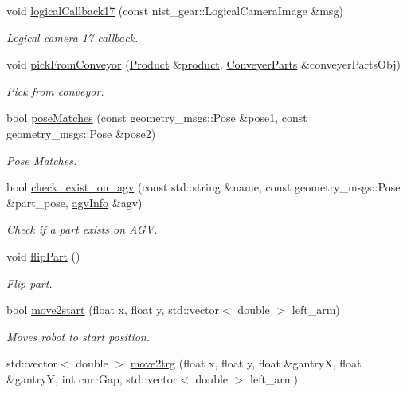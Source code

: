 \begin{DoxyCompactItemize}
void \hyperlink{classGantryControl_a9d745504ec1dbcc8549f5a604f34bbcc}{logical\+Callback17} (const nist\+\_\+gear\+::\+Logical\+Camera\+Image \&msg)
\begin{DoxyCompactList}\small\item\em Logical camera 17 callback. \end{DoxyCompactList}\item 
void \hyperlink{classGantryControl_a0220eeac3687f7f043fa4014f5ea302e}{pick\+From\+Conveyor} (\hyperlink{structProduct}{Product} \&\hyperlink{utils_8h_a48a7207852c0455cce7e65703b12ec7e}{product}, \hyperlink{classConveyerParts}{Conveyer\+Parts} \&conveyer\+Parts\+Obj)
\begin{DoxyCompactList}\small\item\em Pick from conveyor. \end{DoxyCompactList}\item 
bool \hyperlink{classGantryControl_a9c655daed586e64921ffc53cb90b2873}{pose\+Matches} (const geometry\+\_\+msgs\+::\+Pose \&pose1, const geometry\+\_\+msgs\+::\+Pose \&pose2)
\begin{DoxyCompactList}\small\item\em Pose Matches. \end{DoxyCompactList}\item 
bool \hyperlink{classGantryControl_a31672ce076ba59662af6c77c82ab136f}{check\+\_\+exist\+\_\+on\+\_\+agv} (const std\+::string \&name, const geometry\+\_\+msgs\+::\+Pose \&part\+\_\+pose, \hyperlink{structagvInfo}{agv\+Info} \&agv)
\begin{DoxyCompactList}\small\item\em Check if a part exists on A\+GV. \end{DoxyCompactList}\item 
void \hyperlink{classGantryControl_a80a0b29105892d6435ef1bb061f35d8f}{flip\+Part} ()
\begin{DoxyCompactList}\small\item\em Flip part. \end{DoxyCompactList}\item 
bool \hyperlink{classGantryControl_adfbb542c0c4b836ec50bc7cf70557220}{move2start} (float x, float y, std\+::vector$<$ double $>$ left\+\_\+arm)
\begin{DoxyCompactList}\small\item\em Moves robot to start position. \end{DoxyCompactList}\item 
std\+::vector$<$ double $>$ \hyperlink{classGantryControl_aa3b48219dcba01f5608c6a4d9ff447e9}{move2trg} (float x, float y, float \&gantryX, float \&gantryY, int curr\+Gap, std\+::vector$<$ double $>$ left\+\_\+arm)

\end{DoxyCompactItemize}
